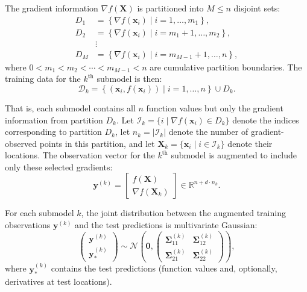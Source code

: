 \documentclass[12pt]{article}
\begin{document}
The gradient information $\nabla f(\mathbf{X})$ is partitioned into $M \leq n$ disjoint sets:
\begin{align}
	D_1 & = \left\{\nabla f(\mathbf{x}_i) \mid  i = 1, \ldots, m_1\right\}, \nonumber \\
	D_2 &= \left\{\nabla f(\mathbf{x}_i) \mid  i = m_1 + 1, \ldots, m_2\right\}, \nonumber  \\
	& \vdots \nonumber  \\
	D_M & = \left\{\nabla f(\mathbf{x}_i) \mid  i = m_{M-1} + 1, \ldots, n\right\}, \nonumber  
\end{align}
where $0 < m_1 < m_2 < \cdots < m_{M-1} < n$ are cumulative partition boundaries. The training data for the $k^{\text{th}}$ submodel is then:
\begin{equation}
	\mathcal{D}_k = \left\{(\mathbf{x}_i, f(\mathbf{x}_i)) \mid i = 1, \ldots, n \right\} \cup D_k.
\end{equation}

That is, each submodel contains all $n$ function values but only the gradient information from partition $D_k$. Let $\mathcal{I}_k = \{i \mid \nabla f(\mathbf{x}_i) \in D_k\}$ denote the indices corresponding to partition $D_k$, let $n_k = |\mathcal{I}_k|$ denote the number of gradient-observed points in this partition, and let $\mathbf{X}_k = \{\mathbf{x}_i \mid i \in \mathcal{I}_k\}$ denote their locations. The observation vector for the $k^{\text{th}}$ submodel is augmented to include only these selected gradients:
\begin{equation}
	\label{eqn:wgek_aug_vector}
	\mathbf{y}^{(k)} = \begin{bmatrix}
		f(\mathbf{X}) \\
		\nabla f(\mathbf{X}_k)
	\end{bmatrix} \in \mathbb{R}^{n + d \cdot n_k}.
\end{equation}

For each submodel $k$, the joint distribution between the augmented training observations $\mathbf{y}^{(k)}$ and the test predictions is multivariate Gaussian:
\begin{equation}
	\label{eqn:wgek_joint_dist}
	\begin{pmatrix}
		\mathbf{y}^{(k)} \\
		\mathbf{y}^{(k)}_*
	\end{pmatrix}
	\sim \mathcal{N}\left(
	\mathbf{0},
	\begin{pmatrix}
		\boldsymbol{\Sigma}^{(k)}_{11} & \boldsymbol{\Sigma}^{(k)}_{12} \\
		\boldsymbol{\Sigma}^{(k)}_{21} & \boldsymbol{\Sigma}^{(k)}_{22}
	\end{pmatrix}
	\right),
\end{equation}
where $\mathbf{y}^{(k)}_*$ contains the test predictions (function values and, optionally, derivatives at test locations).
\end{document}
